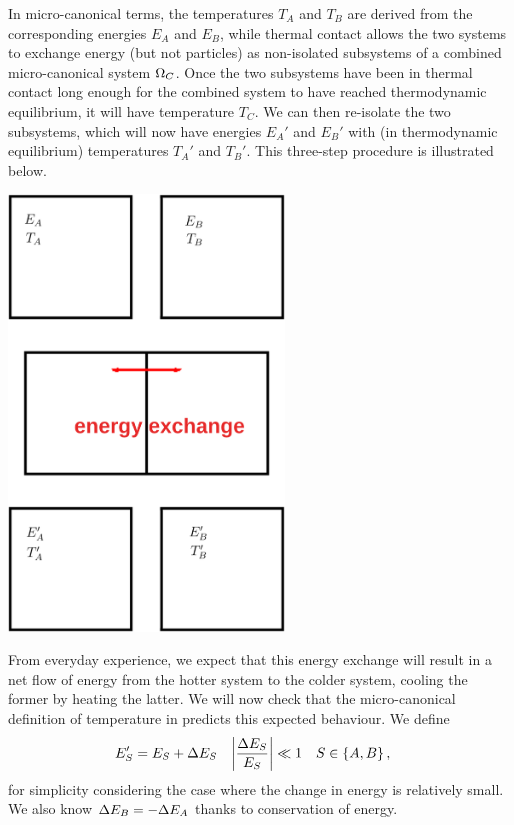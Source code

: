 In micro-canonical terms, the temperatures $T_A$ and $T_B$ are derived from the corresponding energies $E_A$ and $E_B$, while thermal contact allows the two systems to exchange energy (but not particles) as non-isolated subsystems of a combined micro-canonical system $\Omega_C$.
Once the two subsystems have been in thermal contact long enough for the combined system to have reached thermodynamic equilibrium, it will have temperature $T_C$.
We can then re-isolate the two subsystems, which will now have energies $E_A'$ and $E_B'$ with (in thermodynamic equilibrium) temperatures $T_A'$ and $T_B'$.
This three-step procedure is illustrated below.

\begin{center} %
  \includegraphics[width=0.55\textwidth]{figs/unit02_heat-exchange.pdf}
\end{center}

From everyday experience, we expect that this energy exchange will result in a net flow of energy from the hotter system to the colder system, cooling the former by heating the latter.
We will now check that the micro-canonical definition of temperature in  predicts this expected behaviour.
We define
\begin{align*}
  E_S' & = E_S + \Delta E_S &
  \left|\frac{\Delta E_S}{E_S}\right| & \ll 1 &
  S & \in \left\{A, B\right\},
\end{align*}
for simplicity considering the case where the change in energy is relatively small. %
We also know $\Delta E_B = -\Delta E_A$ thanks to conservation of energy.

